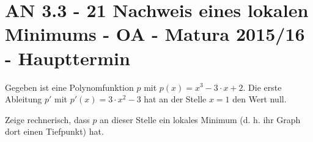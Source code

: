 \section{AN 3.3 - 21 Nachweis eines lokalen Minimums - OA - Matura 2015/16 - Haupttermin}

\begin{beispiel}[AN 3.3]{1} %
Gegeben ist eine Polynomfunktion $p$ mit $p(x) = x^3 - 3 \cdot x + 2$. Die erste Ableitung $p'$ mit $p'(x) = 3 \cdot x^2 - 3$ hat an der Stelle $x = 1$ den Wert null. \leer

Zeige rechnerisch, dass $p$ an dieser Stelle ein lokales Minimum (d. h. ihr Graph dort einen
Tiefpunkt) hat.

\end{beispiel}